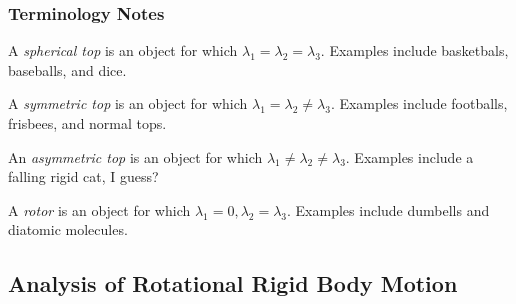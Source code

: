 \documentclass[a4paper]{article}
\begin{document}
\subsubsection{Terminology Notes}
\begin{defi}
	A \emph{spherical top} is an
	object for which $\lambda_1=\lambda_2=\lambda_3$. Examples include
	basketbals, baseballs, and dice.
\end{defi}
\begin{defi}
	A \emph{symmetric top} is an
	object for which $\lambda_1=\lambda_2\neq\lambda_3$.
	Examples include footballs, frisbees, and normal tops.
\end{defi}
\begin{defi}
	An \emph{asymmetric top} is an
	object for which $\lambda_1\neq\lambda_2\neq\lambda_3$. Examples
	include a falling rigid cat, I guess?
\end{defi}
\begin{defi}[Rotor]
	A \emph{rotor} is an
	object for which $\lambda_1=0,\lambda_2=\lambda_3$. Examples
	include dumbells and diatomic molecules.
\end{defi}

\subsection{Analysis of Rotational Rigid Body Motion}
\end{document}

